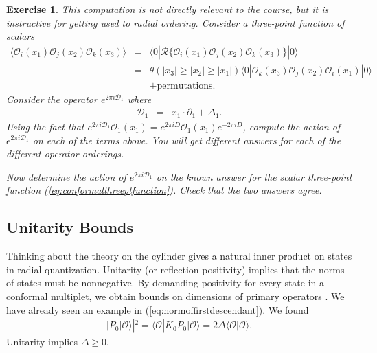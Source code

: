 \documentclass{ws-rv9x6}
\newcommand\be{\begin{eqnarray}}
\newcommand\ee{\end{eqnarray}}
\newcommand\cO{\mathcal{O}}
\newcommand\ptl\partial
\newcommand\<\langle
\renewcommand\>\rangle
\newcommand\nn{\nonumber}
\renewcommand\.{\cdot}
\newcommand\De{\Delta}
\newtheorem{exercise}{Exercise}[section]
\begin{document}
\begin{exercise}
This computation is not directly relevant to the course, but it is instructive for getting used to radial ordering.  Consider a three-point function of scalars
\be
\<\cO_i(x_1)\cO_j(x_2)\cO_k(x_3)\> &=& \<0|\mathcal{R}\{\cO_i(x_1)\cO_j(x_2)\cO_k(x_3)\}|0\>\nn\\
&=&\theta(|x_3|\geq |x_2| \geq |x_1|)\<0|\cO_k(x_3)\cO_j(x_2)\cO_i(x_1)|0\>\nn\\
&&+\mathrm{permutations}.
\ee
Consider the operator $e^{2\pi i\mathcal{D}_1}$ where
\be
\mathcal{D}_1 &=& x_1\.\ptl_1+\De_1.
\ee
Using the fact that $e^{2\pi i\mathcal{D}_1}\cO_1(x_1)= e^{2\pi i D}\cO_1(x_1)e^{-2\pi i D}$, compute the action of $e^{2\pi i \mathcal{D}_1}$ on each of the terms above.  You will get different answers for each of the different operator orderings.

Now determine the action of $e^{2\pi i \mathcal{D}_1}$ on the known answer for the scalar three-point function (\ref{eq:conformalthreeptfunction}).  Check that the two answers agree.
\end{exercise}

\subsection{Unitarity Bounds}

Thinking about the theory on the cylinder gives a natural inner product on states in radial quantization.  Unitarity (or reflection positivity) implies that the norms of states must be nonnegative.  By demanding positivity for every state in a conformal multiplet, we obtain bounds on dimensions of primary operators \cite{Mack:1975je,Jantzen,Minwalla:1997ka}.  We have already seen an example in (\ref{eq:normoffirstdescendant}). We found
\be
|P_0|\cO\>|^2 = \<\cO|K_0 P_0|\cO\> = 2\De\<\cO|\cO\>.
\ee
Unitarity implies $\De\geq 0$.
\end{document}
